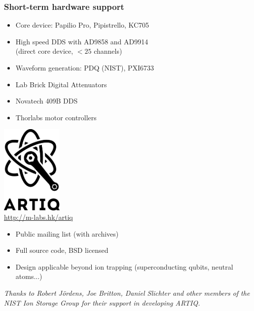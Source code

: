 \documentclass[final,presentation,compress]{beamer}
\begin{document}
\begin{frame}
  \frametitle{Short-term hardware support}
  \footnotesize
  \begin{itemize}
  \item Core device: Papilio Pro, Pipistrello, KC705
  \item High speed DDS with AD9858 and AD9914 \\
  	(direct core device, $ < 25$ channels)
  \item Waveform generation: PDQ (NIST), PXI6733
  \item Lab Brick Digital Attenuators
  \item Novatech 409B DDS
  \item Thorlabs motor controllers
  \end{itemize}
\end{frame}

\begin{frame}
  \begin{center}
  \includegraphics[width=3cm]{../../logo/artiq.pdf} \\
  \url{http://m-labs.hk/artiq}
  \end{center}

  \footnotesize
  \begin{itemize}
    \item Public mailing list (with archives)
    \item Full source code, BSD licensed
    \item Design applicable beyond ion trapping (superconducting qubits,
      neutral atoms...)
  \end{itemize}
  \textit{Thanks to Robert J\"ordens, Joe Britton, Daniel Slichter and other members of the NIST Ion Storage Group for their support in developing ARTIQ.}

\end{frame}
\end{document}
